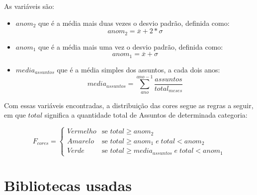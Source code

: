 As variáveis são:
\begin{itemize}
	\item $anom_2$ que é a média mais duas vezes o desvio padrão, definida como: $$anom_2 = \overline{x} + 2*\sigma$$
	
	\item $anom_1$ que é a média mais uma vez o desvio padrão, definida como: $$anom_1 = \overline{x} + \sigma$$
	
	\item $media_{assuntos}$ que é a média simples dos assuntos, a cada dois anos:
	$$media_{assuntos} = \sum\limits_{ano}^{ano-1}\frac{assuntos}{total_{meses}}$$
\end{itemize}

Com essas variáveis encontradas, a distribuição das cores segue as regras a seguir, em que $total$ significa a quantidade total de Assuntos de determinada categoria:

\begin{equation}
	F_{cores} =
	\begin{cases}
		Vermelho & \text{se $total \geq anom_2$}\\
		Amarelo & \text{se $total \geq anom_1 \;e\; total < anom_2$}\\
		Verde & \text{se $total \geq media_{assuntos} \;e\; total < anom_1$}
	\end{cases}       
\end{equation}

\section{Bibliotecas usadas}

